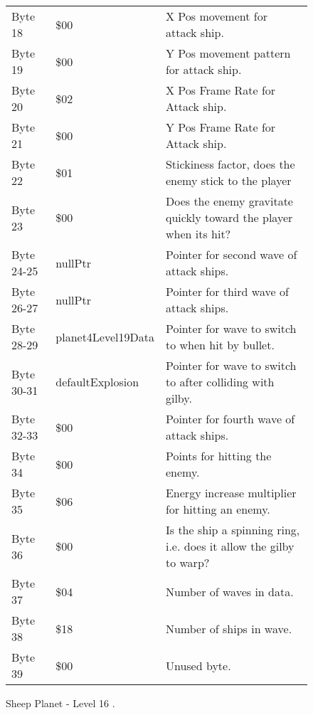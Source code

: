 \begin{figure}[H]
{\begin{adjustbox}{width=12cm}
\begin{tabular}{lll}
 Byte 18    & \$00                & X Pos movement for attack ship.                                     \\
 Byte 19    & \$00                & Y Pos movement pattern for attack ship.                             \\
 Byte 20    & \$02                & X Pos Frame Rate for Attack ship.                                   \\
 Byte 21    & \$00                & Y Pos Frame Rate for Attack ship.                                   \\
 Byte 22    & \$01                & Stickiness factor, does the enemy stick to the player               \\
 Byte 23    & \$00                & Does the enemy gravitate quickly toward the player when its hit?    \\
 Byte 24-25 & nullPtr            & Pointer for second wave of attack ships.                            \\
 Byte 26-27 & nullPtr            & Pointer for third wave of attack ships.                             \\
 Byte 28-29 & planet4Level19Data & Pointer for wave to switch to when hit by bullet.                   \\
 Byte 30-31 & defaultExplosion   & Pointer for  wave to switch to after colliding with gilby.          \\
 Byte 32-33 & \$00                & Pointer for fourth wave of attack ships.                            \\
 Byte 34    & \$00                & Points for hitting the enemy.                                       \\
 Byte 35    & \$06                & Energy increase multiplier for hitting an enemy.                    \\
 Byte 36    & \$00                & Is the ship a spinning ring, i.e. does it allow the gilby to warp?  \\
 Byte 37    & \$04                & Number of waves in data.                                            \\
 Byte 38    & \$18                & Number of ships in wave.                                            \\
 Byte 39    & \$00                & Unused byte.                                                        \\
\bottomrule
\end{tabular}

  \end{adjustbox}

  }\caption*{Sheep Planet - Level 16
.}
\end{figure}

